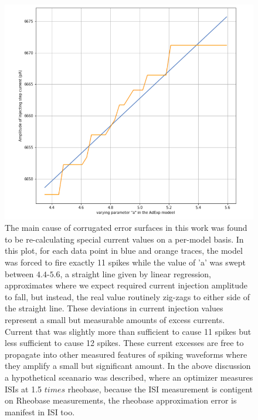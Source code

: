 \begin{figure}
\begin{center}
\includegraphics[]{figures/fundamental_cause_of_corrogations.png}
\caption[Causes of corrugation]{The main cause of corrugated error surfaces in this work was found to be re-calculating special current values on a per-model basis. In this plot, for each data point in blue and orange traces, the model was forced to fire exactly 11 spikes while the value of 'a' was swept between $4.4$-$5.6$, a straight line given by linear regression, approximates where we expect required current injection amplitude to fall, but instead, the real value routinely zig-zags to either side of the straight line. These deviations in current injection values represent a small but measurable amounts of excess currents. Current that was slightly more than sufficient to cause 11 spikes but less sufficient to cause 12 spikes. These current excesses are free to propagate into other measured features of spiking waveforms where they amplify a small but significant amount.
In the above discussion a hypothetical sceanario was described, where an optimizer measures ISIs at 1.5 $times$ rheobase, because the ISI measurement is contigent on Rheobase measurements, the rheobase approximation error is manifest in ISI too.}
\label{fig:corrugation-cause-1}
\end{center}
\end{figure}

